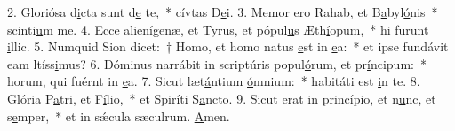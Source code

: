 2. Gloriósa d\uline{i}cta sunt d\uline{e} te,~* cívtas D\uline{e}i.
3. Memor ero Rahab, et B\uline{a}byl\uline{ó}nis~* scinti\uline{u}m me.
4. Ecce alienígenæ, et Tyrus, et pópul\uline{u}s Æth\uline{í}opum,~* hi furunt \uline{i}llic.
5. Numquid Sion dicet:~† Homo, et homo natus \uline{e}st in \uline{e}a:~* et ipse fundávit eam ltíss\uline{i}mus?
6. Dóminus narrábit in scriptúris popul\uline{ó}rum, et pr\uline{í}ncipum:~* horum, qui fuérnt in \uline{e}a.
7. Sicut læt\uline{á}ntium \uline{ó}mnium:~* habitáti est \uline{i}n te.
8. Glória P\uline{a}tri, et F\uline{í}lio,~* et Spiríti S\uline{a}ncto.
9. Sicut erat in princípio, et n\uline{u}nc, et s\uline{e}mper,~* et in sǽcula sæculrum. \uline{A}men.
